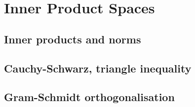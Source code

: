 
\section{Inner Product Spaces}

\subsection{Inner products and norms}


\subsection{Cauchy-Schwarz, triangle inequality}


\subsection{Gram-Schmidt orthogonalisation}

